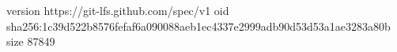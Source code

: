 version https://git-lfs.github.com/spec/v1
oid sha256:1c39d522b8576fefaf6a090088aeb1ec4337e2999adb90d53d53a1ae3283a80b
size 87849

